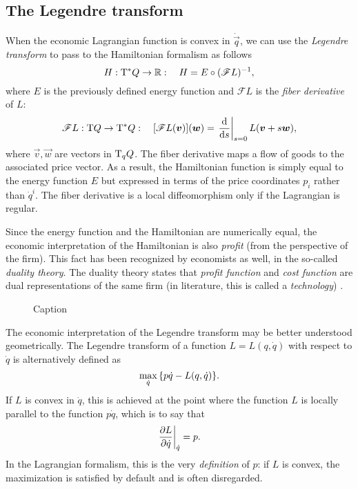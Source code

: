\subsection{The Legendre transform} 
When the economic Lagrangian function is convex in \(\dot{\vec{q}}\), we can use the \emph{Legendre transform} to pass to the Hamiltonian formalism as follows \cite{Abraham1978}
\begin{equation}
    H: \mathrm{T}^*Q \to \mathbb{R}: \quad H = E \circ (\mathscr{F}L)^{-1},
\end{equation}
where \(E\) is the previously defined energy function and \(\mathscr{F}L\) is the \emph{fiber derivative} of \(L\): \cite{Marsden1998}
\begin{equation}
    \mathscr{F}L: \tbundle{Q} \to \ctbundle{Q}: \quad [\mathscr{F}L(\vec{v})](\vec{w}) = \left .\dv{}{s}\right|_{s = 0} L(\vec{v} + s\vec{w}),
\end{equation}
where \(\vec{v}, \vec{w}\) are vectors in \(\mathrm{T}_{q} Q\). The fiber derivative maps a flow of goods to the associated price vector. As a result, the Hamiltonian function is simply equal to the energy function \(E\) but expressed in terms of the price coordinates \(p_i\) rather than \(\dot{q}^i\). The fiber derivative is a local diffeomorphism only if the Lagrangian is regular.

Since the energy function and the Hamiltonian are numerically equal, the economic interpretation of the Hamiltonian is also \emph{profit} (from the perspective of the firm). This fact has been recognized by economists as well, in the so-called \emph{duality theory}. The duality theory states that \emph{profit function} and \emph{cost function} are dual representations of the same firm (in literature, this is called a \emph{technology}) \cite{blume2020,varianhalr1992}.

\begin{figure}[ht]
    \centering
    
    \caption{Caption}
    \label{fig:my_label}
\end{figure}

The economic interpretation of the Legendre transform may be better understood geometrically. The Legendre transform of a function $L = L(q, \dot{q})$ with respect to $\dot{q}$ is alternatively defined as
\begin{equation}
    \max_{\dot{q}}\qty{p\dot{q} - L(q, \dot{q})}.
\end{equation}
If $L$ is convex in $\dot{q}$, this is achieved at the point where the function $L$ is locally parallel to the function $p\dot{q}$, which is to say that
\begin{equation}
    \left.\pdv{L}{\dot{q}}\right |_{\dot{q}} = p.
\end{equation}
In the Lagrangian formalism, this is the very \emph{definition} of $p$: if $L$ is convex, the maximization is satisfied by default and is often disregarded.

